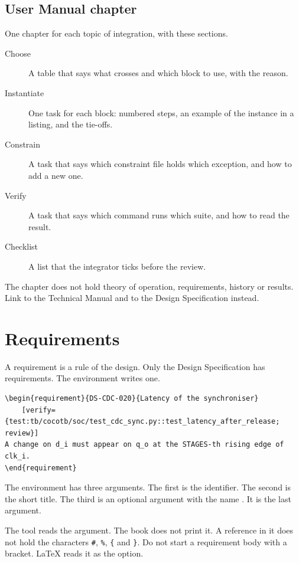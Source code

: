 \subsection{User Manual chapter}
One chapter for each topic of integration, with these sections.
\begin{description}
  \item[Choose] A table that says what crosses and which block to use, with the reason.
  \item[Instantiate] One task for each block: numbered steps, an example of the instance in a listing, and the tie-offs.
  \item[Constrain] A task that says which constraint file holds which exception, and how to add a new one.
  \item[Verify] A task that says which command runs which suite, and how to read the result.
  \item[Checklist] A list that the integrator ticks before the review.
\end{description}
The chapter does not hold theory of operation, requirements, history or results. Link to the Technical Manual and to the Design Specification instead.

\section{Requirements}\label{um:guide:requirements}
A requirement is a rule of the design. Only the Design Specification has requirements. The environment  writes one.
\begin{lstlisting}[language={[LaTeX]TeX}]
\begin{requirement}{DS-CDC-020}{Latency of the synchroniser}
    [verify={test:tb/cocotb/soc/test_cdc_sync.py::test_latency_after_release; review}]
A change on d_i must appear on q_o at the STAGES-th rising edge of clk_i.
\end{requirement}
\end{lstlisting}
The environment has three arguments. The first is the identifier. The second is the short title. The third is an optional argument with the name . It is the last argument.

The tool  reads the  argument. The book does not print it. A reference in it does not hold the characters \texttt{\#}, \texttt{\%}, \texttt{\{} and \texttt{\}}. Do not start a requirement body with a bracket. \LaTeX{} reads it as the option.

